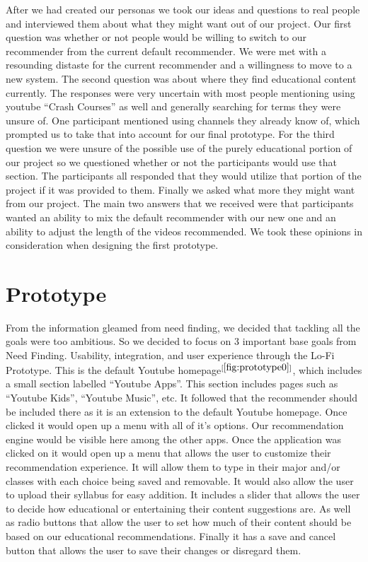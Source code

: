 \documentclass[letterpaper]{article} %
\begin{document}
After we had created our personas we took our ideas and questions to real people and interviewed them about what they might want out of our project. Our first question was whether or not people would be willing to switch to our recommender from the current default recommender. We were met with a resounding distaste for the current recommender and a willingness to move to a new system. The second question was about where they find educational content currently. The responses were very uncertain with most people mentioning using youtube “Crash Courses” as well and generally searching for terms they were unsure of. One participant mentioned using channels they already know of, which prompted us to take that into account for our final prototype. For the third question we were unsure of the possible use of the purely educational portion of our project so we questioned whether or not the participants would use that section. The participants all responded that they would utilize that portion of the project if it was provided to them. Finally we asked what more they might want from our project. The main two answers that we received were that participants wanted an ability to mix the default recommender with our new one and an ability to adjust the length of the videos recommended. We took these opinions in consideration when designing the first prototype.

\section{Prototype}

From the information gleamed from need finding, we decided that tackling all the goals were too ambitious. So we decided to focus on 3 important base goals from Need Finding. Usability, integration, and user experience through the Lo-Fi Prototype. This is the default Youtube homepage$^{[\ref{fig:prototype0}]}$, which includes a small section labelled “Youtube Apps”. This section includes pages such as “Youtube Kids”, “Youtube Music”, etc. It followed that the recommender should be included there as it is an extension to the default Youtube homepage. Once clicked it would open up a menu with all of it’s options. Our recommendation engine would be visible here among the other apps. Once the application was clicked on it would open up a menu that allows the user to customize their recommendation experience. It will allow them to type in their major and/or classes with each choice being saved and removable. It would also allow the user to upload their syllabus for easy addition. It includes a slider that allows the user to decide how educational or entertaining their content suggestions are. As well as radio buttons that allow the user to set how much of their content should be based on our educational recommendations. Finally it has a save and cancel button that allows the user to save their changes or disregard them.
\end{document}
